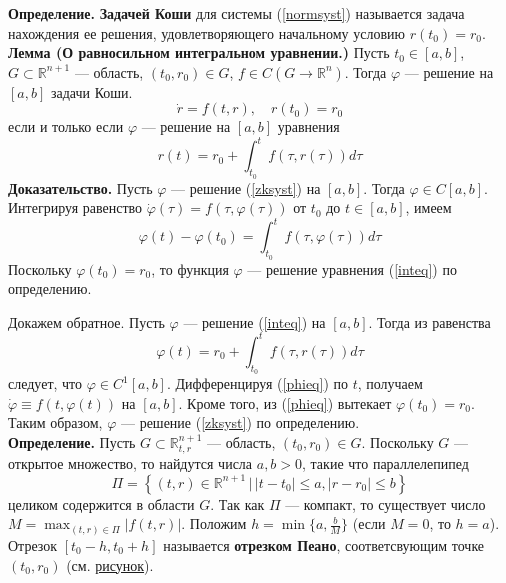 \documentclass{article}
\begin{document}
\noindent \textbf{Определение.} \textbf{Задачей Коши} для системы (\ref{normsyst}) называется задача нахождения ее решения, удовлетворяющего начальному условию $r(t_0) = r_0$.\\

\noindent \textbf{Лемма (О равносильном интегральном уравнении.)} Пусть $t_0 \in [a,b]$, $G \subset \mathbb{R}^{n + 1}$ --- область, $(t_0, r_0) \in G$, $f \in C(G \to \mathbb{R}^n)$. Тогда $\varphi$ --- решение на $[a,b]$ задачи Коши.
\begin{equation}
    \dot{r} = f(t,r), \quad r(t_0)=r_0 \label{zksyst}
\end{equation}
если и только если $\varphi$ --- решение на $[a,b]$ уравнения
\begin{equation}
    r(t) = r_0 + \int_{t_0}^{t} f(\tau, r(\tau))d\tau \label{inteq}
\end{equation}
\textbf{Доказательство.} Пусть $\varphi$ --- решение (\ref{zksyst}) на $[a,b]$. Тогда $\varphi \in C[a,b]$. Интегрируя равенство $\dot{\varphi}(\tau) = f(\tau, \varphi(\tau))$ от $t_0$ до $t \in [a,b]$, имеем
\begin{equation*}
    \varphi(t) - \varphi(t_0) = \int_{t_0}^{t} f(\tau, \varphi(\tau))d\tau
\end{equation*}
Поскольку $\varphi(t_0) = r_0$, то функция $\varphi$ --- решение уравнения (\ref{inteq}) по определению.

Докажем обратное. Пусть $\varphi$ --- решение (\ref{inteq}) на $[a,b]$. Тогда из равенства
\begin{equation}
    \varphi(t) = r_0 + \int_{t_0}^{t} f(\tau, r(\tau))d\tau \label{phieq}
\end{equation}
следует, что $\varphi \in C^1[a,b]$. Дифференцируя (\ref{phieq}) по $t$, получаем $\dot{\varphi} \equiv f(t, \varphi(t))$ на $[a,b]$. Кроме того, из (\ref{phieq}) вытекает $\varphi(t_0) = r_0$. Таким образом, $\varphi$ --- решение (\ref{zksyst}) по определению.\\

\noindent \textbf{Определение.} Пусть $G \subset \mathbb{R}_{t,r}^{n+1}$ --- область, $(t_0, r_0) \in G$. Поскольку $G$ --- открытое множество, то найдутся числа $a,b > 0$, такие что параллелепипед
\begin{equation*}
    \Pi = \left\{(t,r) \in \mathbb{R}^{n+1}\,|\, |t-t_0| \le a, |r-r_0|\le b \right\}
\end{equation*}
целиком содержится в области $G$. Так как $\Pi$ --- компакт, то существует число $M = \displaystyle\max_{(t,r)\in \Pi} |f(t,r)|$. Положим $h = \min \{a, \frac{b}{M}\}$ (если $M = 0$, то $h = a$). Отрезок $[t_0 - h, t_0 + h]$ называется \textbf{отрезком Пеано}, соответсвующим точке $(t_0, r_0)$ (см. \hyperref[peano]{рисунок}).
\end{document}
